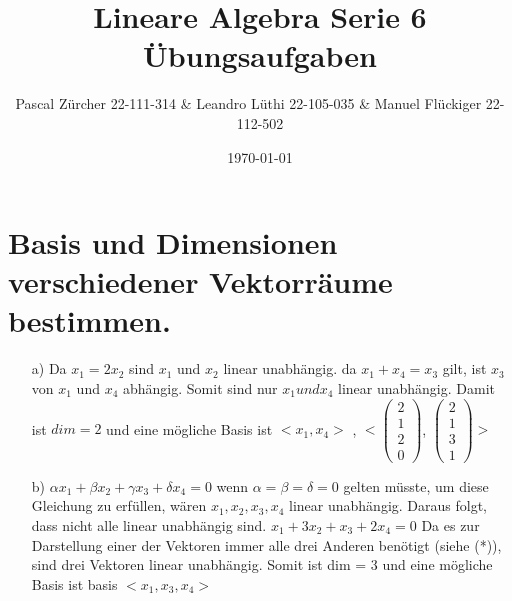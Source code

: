 \documentclass{article}
\author{
Pascal Zürcher 22-111-314 & 
Leandro Lüthi 22-105-035 & 
Manuel Flückiger 22-112-502}
\title{Lineare Algebra Serie 6 Übungsaufgaben}
\date{\today}
\begin{document}
\maketitle
\section{Basis und Dimensionen verschiedener Vektorräume bestimmen.}
    \begin{enumerate}

        \item[a)]
        Da $x_1 = 2x_2$ sind $x_1$ und $x_2$ linear 
        unabhängig. da $x_1 + x_4 = x_3$ gilt, ist $x_3$ von $x_1$ und $x_4$ 
        abhängig. Somit sind nur $x_1 und x_4$ linear unabhängig.
        Damit ist $dim = 2$ und eine mögliche Basis ist 
        \newline
        $<x_1, x_4>$ ,
        $<\left(\begin{array}{c}2\\1\\2\\0\end{array}\right)$,
        $\left(\begin{array}{c}2\\1\\3\\1\end{array}\right)>$

        \item[b)]
        $\alpha x_1 + \beta x_2 + \gamma x_3 + \delta x_4 = 0$ wenn $\alpha = \beta=\delta=0$
        gelten müsste, um diese Gleichung zu erfüllen, wären $x_1,x_2,x_3,x_4$ linear unabhängig.
        Daraus folgt, dass nicht alle linear unabhängig sind. $x_1+3x_2+x_3+2x_4 = 0$ Da es zur 
        Darstellung einer der Vektoren immer alle drei Anderen benötigt (siehe (*)), sind 
        drei Vektoren linear unabhängig. Somit ist dim = 3 und eine mögliche Basis 
        ist basis $<x_1,x_3,x_4>$
        \newline


\end{enumerate}
\end{document}
